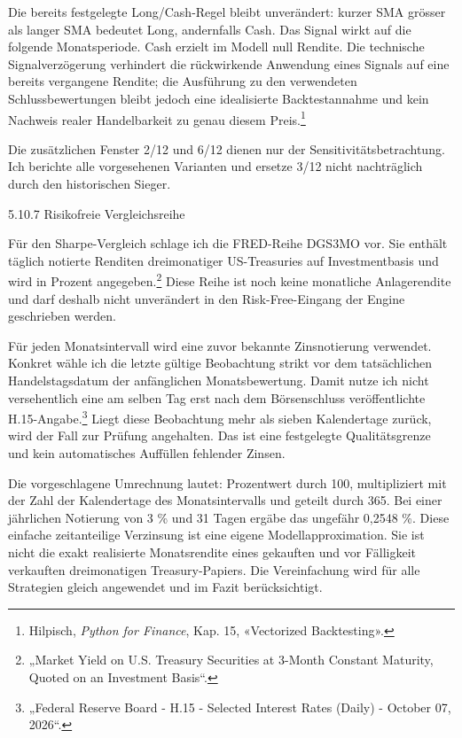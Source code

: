 \documentclass[
  ngerman,
  a4paper,
  DIV=11,
  oneside]{scrreprt}
\begin{document}
Die bereits festgelegte Long/Cash-Regel bleibt unverändert: kurzer SMA
grösser als langer SMA bedeutet Long, andernfalls Cash. Das Signal wirkt
auf die folgende Monatsperiode. Cash erzielt im Modell null Rendite. Die
technische Signalverzögerung verhindert die rückwirkende Anwendung eines
Signals auf eine bereits vergangene Rendite; die Ausführung zu den
verwendeten Schlussbewertungen bleibt jedoch eine idealisierte
Backtestannahme und kein Nachweis realer Handelbarkeit zu genau diesem
Preis.\footnote{Hilpisch, \emph{Python for Finance}, Kap. 15,
  «Vectorized Backtesting».}

Die zusätzlichen Fenster 2/12 und 6/12 dienen nur der
Sensitivitätsbetrachtung. Ich berichte alle vorgesehenen Varianten und
ersetze 3/12 nicht nachträglich durch den historischen Sieger.

5.10.7 Risikofreie Vergleichsreihe

Für den Sharpe-Vergleich schlage ich die FRED-Reihe DGS3MO vor. Sie
enthält täglich notierte Renditen dreimonatiger US-Treasuries auf
Investmentbasis und wird in Prozent angegeben.\footnote{{„Market {Yield}
  on {U}.{S}. {Treasury Securities} at 3-{Month Constant Maturity},
  {Quoted} on an {Investment Basis}``}.} Diese Reihe ist noch keine
monatliche Anlagerendite und darf deshalb nicht unverändert in den
Risk-Free-Eingang der Engine geschrieben werden.

Für jeden Monatsintervall wird eine zuvor bekannte Zinsnotierung
verwendet. Konkret wähle ich die letzte gültige Beobachtung strikt vor
dem tatsächlichen Handelstagsdatum der anfänglichen Monatsbewertung.
Damit nutze ich nicht versehentlich eine am selben Tag erst nach dem
Börsenschluss veröffentlichte H.15-Angabe.\footnote{{„Federal {Reserve
  Board} - {H}.15 - {Selected Interest Rates} ({Daily}) - {October} 07,
  2026``}.} Liegt diese Beobachtung mehr als sieben Kalendertage zurück,
wird der Fall zur Prüfung angehalten. Das ist eine festgelegte
Qualitätsgrenze und kein automatisches Auffüllen fehlender Zinsen.

Die vorgeschlagene Umrechnung lautet: Prozentwert durch 100,
multipliziert mit der Zahl der Kalendertage des Monatsintervalls und
geteilt durch 365. Bei einer jährlichen Notierung von 3 \% und 31 Tagen
ergäbe das ungefähr 0,2548 \%. Diese einfache zeitanteilige Verzinsung
ist eine eigene Modellapproximation. Sie ist nicht die exakt realisierte
Monatsrendite eines gekauften und vor Fälligkeit verkauften
dreimonatigen Treasury-Papiers. Die Vereinfachung wird für alle
Strategien gleich angewendet und im Fazit berücksichtigt.
\end{document}
